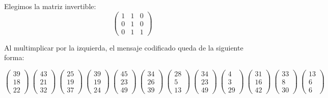 \documentclass[12pt,a4paper]{article}
\begin{document}
Elegimos la matriz invertible:
$$\left(\begin{array}{ccc}1&1&0\\0&1&0\\0&1&1\end{array}\right)$$

Al multimplicar por la izquierda, el mensaje codificado queda de la siguiente forma:

{\tiny $$\left(\begin{array}{c}39\\18\\22\end{array}\right)~\left(\begin{array}{c}43\\21\\32\end{array}\right)~\left(\begin{array}{c}25\\19\\37\end{array}\right)~\left(\begin{array}{c}39\\19\\24\end{array}\right)~\left(\begin{array}{c}45\\23\\49\end{array}\right)~\left(\begin{array}{c}34\\26\\39\end{array}\right)~\left(\begin{array}{c}28\\5\\13\end{array}\right)~\left(\begin{array}{c}34\\23\\49\end{array}\right)~\left(\begin{array}{c}4\\3\\29\end{array}\right)~\left(\begin{array}{c}31\\16\\42\end{array}\right)~\left(\begin{array}{c}33\\8\\30\end{array}\right)~\left(\begin{array}{c}13\\6\\6\end{array}\right)$$}
\end{document}
